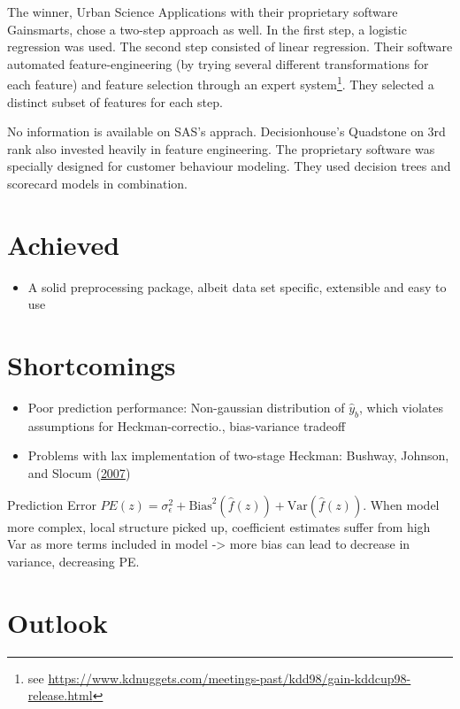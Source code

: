 \documentclass[
  11pt,
  a4paper,
  DIV=12,captions=tableheading,oneside,titlepage]{scrbook}
\providecommand{\tightlist}{%
  \setlength{\itemsep}{0pt}\setlength{\parskip}{0pt}}
\begin{document}
The winner, Urban Science Applications with their proprietary software Gainsmarts, chose a two-step approach as well. In the first step, a logistic regression was used. The second step consisted of linear regression. Their software automated feature-engineering (by trying several different transformations for each feature) and feature selection through an expert system\footnote{see \url{https://www.kdnuggets.com/meetings-past/kdd98/gain-kddcup98-release.html}}. They selected a distinct subset of features for each step.

No information is available on SAS's apprach. Decisionhouse's Quadstone on 3rd rank also invested heavily in feature engineering. The proprietary software was specially designed for customer behaviour modeling. They used decision trees and scorecard models in combination.

\hypertarget{achieved}{%
\section{Achieved}\label{achieved}}

\begin{itemize}
\tightlist
\item
  A solid preprocessing package, albeit data set specific, extensible and easy to use
\end{itemize}

\hypertarget{shortcomings}{%
\section{Shortcomings}\label{shortcomings}}

\begin{itemize}
\item
  Poor prediction performance: Non-gaussian distribution of \(\hat{y}_b\), which violates assumptions for Heckman-correctio., bias-variance tradeoff
\item
  Problems with lax implementation of two-stage Heckman: Bushway, Johnson, and Slocum (\protect\hyperlink{ref-bushway2007magic}{2007})
\end{itemize}

Prediction Error \(PE(z) = \sigma_{\epsilon}^2+\text{Bias}^2(\hat{f}(z))+\text{Var}(\hat{f}(z))\). When model more complex, local structure picked up, coefficient estimates suffer from high Var as more terms included in model -\textgreater{} more bias can lead to decrease in variance, decreasing PE.

\hypertarget{outlook}{%
\section{Outlook}\label{outlook}}
\end{document}
